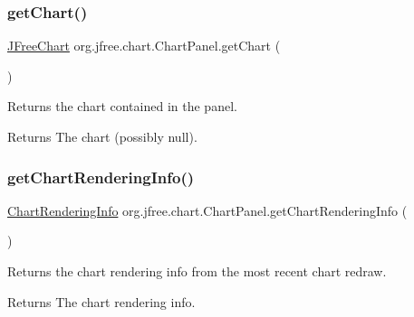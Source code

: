 \subsubsection{\texorpdfstring{get\+Chart()}{getChart()}}
{\footnotesize\ttfamily \mbox{\hyperlink{classorg_1_1jfree_1_1chart_1_1_j_free_chart}{J\+Free\+Chart}} org.\+jfree.\+chart.\+Chart\+Panel.\+get\+Chart (\begin{DoxyParamCaption}{ }\end{DoxyParamCaption})}

Returns the chart contained in the panel.

\begin{DoxyReturn}{Returns}
The chart (possibly {\ttfamily null}). 
\end{DoxyReturn}
\mbox{\label{classorg_1_1jfree_1_1chart_1_1_chart_panel_a7b2abb8f9375ac6b68f7e1a83903cf74}} 
\subsubsection{\texorpdfstring{get\+Chart\+Rendering\+Info()}{getChartRenderingInfo()}}
{\footnotesize\ttfamily \mbox{\hyperlink{classorg_1_1jfree_1_1chart_1_1_chart_rendering_info}{Chart\+Rendering\+Info}} org.\+jfree.\+chart.\+Chart\+Panel.\+get\+Chart\+Rendering\+Info (\begin{DoxyParamCaption}{ }\end{DoxyParamCaption})}

Returns the chart rendering info from the most recent chart redraw.

\begin{DoxyReturn}{Returns}
The chart rendering info. 
\end{DoxyReturn}
\mbox{\label{classorg_1_1jfree_1_1chart_1_1_chart_panel_a577d69ef73aea1e3ecdeb077ad76ea0e}} 
